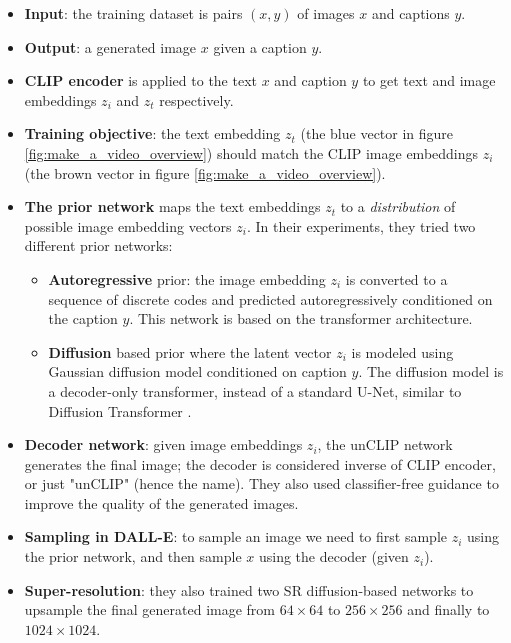 \begin{itemize}
    \item \textbf{Input}: the training dataset is pairs $(x,y)$ of images $x$ and captions $y$.
    
    \item \textbf{Output}: a generated image $x$ given a caption $y$.

    \item \textbf{CLIP encoder} is applied to the text $x$ and caption $y$ to get text and image embeddings $z_i$ and $z_t$ respectively.
    
    \item \textbf{Training objective}: the text embedding $z_t$ (the blue vector in figure \ref{fig:make_a_video_overview}) should match the CLIP image embeddings $z_i$ (the brown vector in figure \ref{fig:make_a_video_overview}).
    
    \item \textbf{The prior network} maps the text embeddings $z_t$ to a \textit{distribution} of possible image embedding vectors $z_i$. In their experiments, they tried two different prior networks:
        \begin{itemize}
            \item \textbf{Autoregressive} prior: the image embedding $z_i$ is converted to a sequence of discrete codes and predicted autoregressively conditioned on the caption $y$. This network is based on the transformer architecture.
            \item \textbf{Diffusion} based prior where the latent vector $z_i$ is modeled using Gaussian diffusion model conditioned on caption $y$. The diffusion model is a decoder-only transformer, instead of a standard U-Net, similar to Diffusion Transformer \cite{diffusion_transformer}.
        \end{itemize}
    
    \item \textbf{Decoder network}: given image embeddings $z_i$, the unCLIP network generates the final image; the decoder is considered inverse of CLIP encoder, or just "unCLIP" (hence the name). They also used classifier-free guidance to improve the quality of the generated images.
    
    \item \textbf{Sampling in DALL-E}: to sample an image we need to first sample $z_i$ using the prior network, and then sample $x$ using the decoder (given $z_i$).
    
    \item \textbf{Super-resolution}: they also trained two SR diffusion-based networks to upsample the final generated image from $64\times 64$ to $256\times 256$ and finally to $1024\times 1024$.
\end{itemize}


